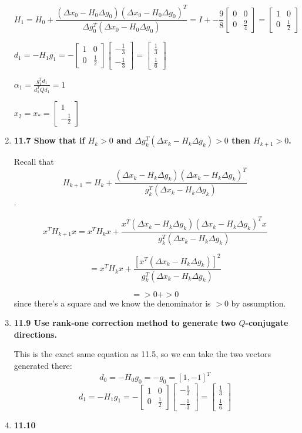 \documentclass[10pt,a4paper]{article}
\newcommand\m[1]{\begin{bmatrix}#1\end{bmatrix}}
\begin{document}
\begin{enumerate}
    $$H_1 = H_0 + \frac{(\Delta x_0 - H_0 \Delta g_0)(\Delta x_0 - H_0 \Delta g_0)^T}{\Delta g_0^T(\Delta x_0 - H_0 \Delta g_0)} = I + -\frac{9}{8} \m{0 & 0 \\ 0 & \frac{9}{4}} = \m{1 & 0 \\0 & \frac{1}{2}}$$

    $d_1 = -H_1g_1 =  - \m{1 & 0 \\0 & \frac{1}{2}} \m{-\frac{1}{3} \\ -\frac{1}{3}} = \m{\frac{1}{3} \\ \frac{1}{6}}$

    $\alpha_1 = \frac{g_1^Td_1}{d_1^TQd_1} = 1$

    $x_2 = x_* = \m{1 \\ -\frac{1}{2}}$
    
    \item \textbf{11.7 Show that if $H_k > 0$ and $\Delta g_k^T(\Delta x_k - H_k \Delta g_k) > 0$ then $H_{k+1} > 0$.}
   
    Recall that $$H_{k+1} = H_k + \frac{(\Delta x_k - H_k \Delta g_k)(\Delta x_k - H_k \Delta g_k)^T}{g_k^T(\Delta x_k - H_k \Delta g_k)}$$. 

    $$x^TH_{k+1}x = x^TH_kx + \frac{x^T(\Delta x_k - H_k \Delta g_k)(\Delta x_k - H_k \Delta g_k)^Tx}{g_k^T(\Delta x_k - H_k \Delta g_k)}$$

    $$ = x^TH_kx + \frac{[x^T(\Delta x_k - H_k \Delta g_k)]^2}{g_k^T(\Delta x_k - H_k \Delta g_k)}$$

    $$ = > 0 + > 0$$ since there's a square and we know the denominator is $>0$ by assumption.

    \item \textbf{11.9 Use rank-one correction method to generate two $Q$-conjugate directions.}
    
    This is the exact same equation as 11.5, so we can take the two vectors generated there:
    $$d_0 = -H_0g_0 = -g_0 = [1, -1]^T$$
    $$d_1 = -H_1g_1 =  - \m{1 & 0 \\0 & \frac{1}{2}} \m{-\frac{1}{3} \\ -\frac{1}{3}} = \m{\frac{1}{3} \\ \frac{1}{6}}$$

    \item \textbf{11.10}

\end{enumerate}
\end{document}
